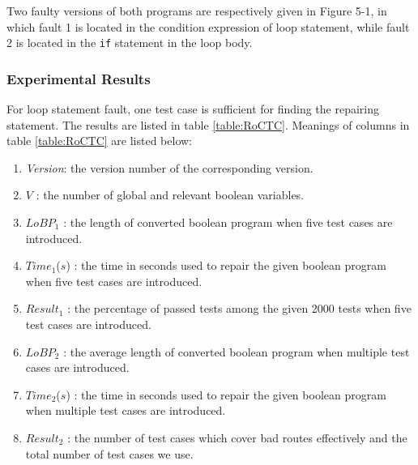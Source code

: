 Two faulty versions of both programs are respectively given in Figure 5-1, in which fault 1 is located in the condition expression of loop statement, while fault 2 is located in the \lstinline|if| statement in the loop body.


\subsubsection{Experimental Results}
For loop statement fault, one test case is sufficient for finding the repairing statement.
The results are listed in table \ref{table:RoCTC}. Meanings of columns in table \ref{table:RoCTC} are listed below:

\begin{enumerate}
\item {\it Version}: the version number of the corresponding version.
\item $V$             : the number of global and relevant boolean variables.
\item $LoBP_{1}$      : the length of converted boolean program when five test cases are introduced.
\item $Time_{1}$($s$) : the time in seconds used to repair the given boolean program when five test cases are introduced.
\item $Result_{1}$    : the percentage of passed tests among the given 2000 tests when five test cases are introduced.
\item $LoBP_{2}$      : the average length of converted boolean program when multiple test cases are introduced.
\item $Time_{2}$($s$) : the time in seconds used to repair the given boolean program when multiple test cases are introduced.
\item $Result_{2}$    : the number of test cases which cover bad routes effectively and the total number of test cases we use.
\end{enumerate}

